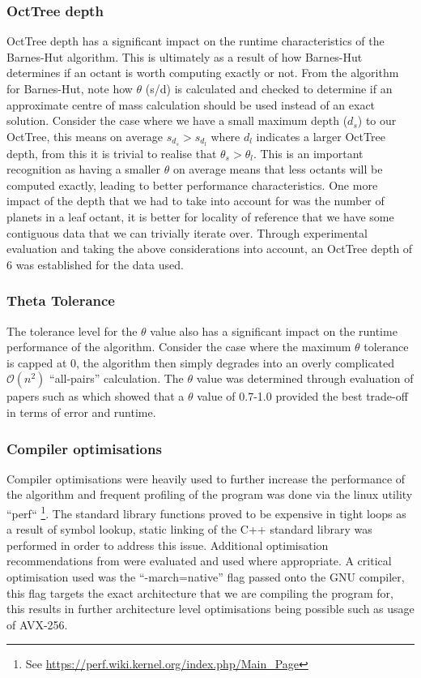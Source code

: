 \documentclass[acmtog,screen, nonacm=true]{acmart}
\begin{document}
\subsubsection{OctTree depth}
OctTree depth has a significant impact on the runtime characteristics of the Barnes-Hut algorithm. This is ultimately as a result of how Barnes-Hut determines if an octant is worth computing exactly or not. From the algorithm for Barnes-Hut, note how $\theta$ (s/d) is calculated and checked to determine if an approximate centre of mass calculation should be used instead of an exact solution. Consider the case where we have a small maximum depth ($d_s$) to our OctTree, this means on average $s_{d_s} > s_{d_l}$ where $d_l$ indicates a larger OctTree depth, from this it is trivial to realise that $\theta_s > \theta_l$. This is an important recognition as having a smaller $\theta$ on average means that less octants will be computed exactly, leading to better performance characteristics. One more impact of the depth that we had to take into account for was the number of planets in a leaf octant, it is better for locality of reference that we have some contiguous data that we can trivially iterate over. Through experimental evaluation and taking the above considerations into account, an OctTree depth of 6 was established for the data used. 

\subsubsection{Theta Tolerance}
The tolerance level for the $\theta$ value also has a significant impact on the runtime performance of the algorithm. Consider the case where the maximum $\theta$ tolerance is capped at 0, the algorithm then simply degrades into an overly complicated $\mathcal{O}(n^2)$ ``all-pairs'' calculation. The $\theta$ value was determined through evaluation of papers such as \cite{van2013barnes} which showed that a $\theta$ value of 0.7-1.0 provided the best trade-off in terms of error and runtime.

\subsubsection{Compiler optimisations}
Compiler optimisations were heavily used to further increase the performance of the algorithm and frequent profiling of the program was done via the linux utility ``perf`` \footnote{See \url{https://perf.wiki.kernel.org/index.php/Main_Page}}. The standard library functions proved to be expensive in tight loops as a result of symbol lookup, static linking of the C++ standard library was performed in order to address this issue. Additional optimisation recommendations from \cite{fog2020optimizing} were evaluated and used where appropriate. A critical optimisation used was the ``-march=native'' flag passed onto the GNU compiler, this flag targets the exact architecture that we are compiling the program for, this results in further architecture level optimisations being possible such as usage of AVX-256.
\end{document}
